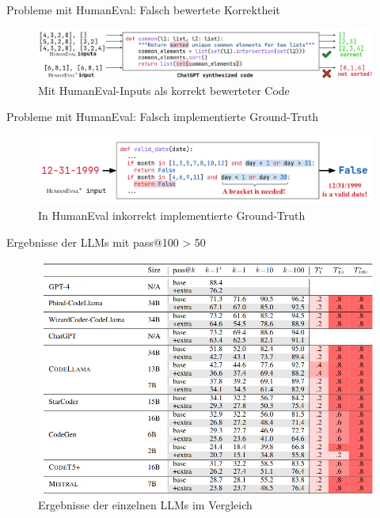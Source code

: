 \documentclass{beamer}              %
\begin{document}
\begin{frame}{Probleme mit HumanEval: Falsch bewertete Korrektheit}
    \begin{figure}
        \centering
        \includegraphics[width=0.8\paperwidth]{images/sortedlistwrong.png}
        \caption{Mit HumanEval-Inputs als korrekt bewerteter Code\cite{liu2024your}}
    \end{figure}
\end{frame}

\begin{frame}{Probleme mit HumanEval: Falsch implementierte Ground-Truth}
    \begin{figure}
        \centering
        \includegraphics[width=0.8\paperwidth]{images/groundtruthwrong.png}
        \caption{In HumanEval inkorrekt implementierte Ground-Truth\cite{liu2024your}}
    \end{figure}
\end{frame}

\begin{frame}{Ergebnisse der LLMs mit pass@100 > 50}
    \begin{figure}
        \centering
        \includegraphics[width=0.7\paperwidth]{images/resultshumaneval+.png}
        \caption{Ergebnisse der einzelnen LLMs im Vergleich\cite{liu2024your}}
    \end{figure}
\end{frame}
\end{document}
